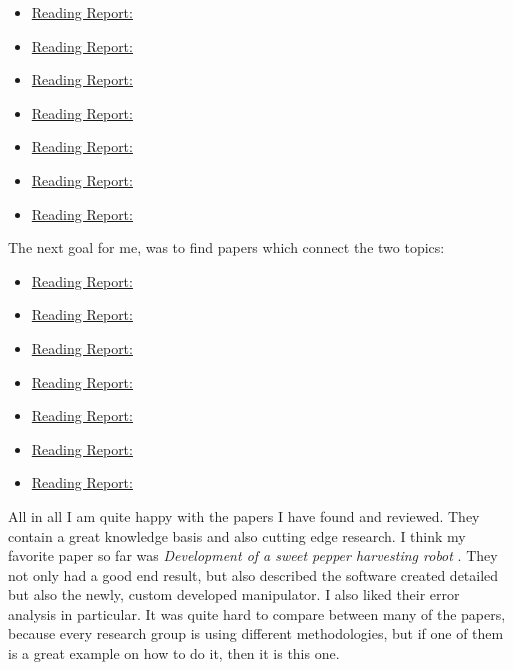     \begin{itemize}
        \item \hyperref[sec:Arai2002]{Reading Report:} \cite{Arai2002}
        \item \hyperref[sec:Brambilla2013]{Reading Report:} \cite{Brambilla2013}
        \item \hyperref[sec:Chamanbaz2017]{Reading Report:} \cite{Chamanbaz2017}
        \item \hyperref[sec:Gerkey2004]{Reading Report:} \cite{Gerkey2004}
        \item \hyperref[sec:Lerman2006]{Reading Report:} \cite{Lerman2006}
        \item \hyperref[sec:Khamis2015]{Reading Report:} \cite{Khamis2015}
        \item \hyperref[sec:Korsah2013]{Reading Report:} \cite{Korsah2013}
    \end{itemize}
    The next goal for me, was to find papers which connect the two topics: 
    \begin{itemize}
        \item \hyperref[sec:Albani2017]{Reading Report:} \cite{Albani2017}
        \item \hyperref[sec:Albani2019]{Reading Report:} \cite{Albani2019}
        \item \hyperref[sec:Bechar2017]{Reading Report:} \cite{Bechar2017}
        \item \hyperref[sec:ConesaMunoz2015]{Reading Report:} \cite{ConesaMunoz2015}
        \item \hyperref[sec:deSantos2016]{Reading Report:} \cite{deSantos2016}
        \item \hyperref[sec:deSantos2020]{Reading Report:} \cite{deSantos2020}
        \item \hyperref[sec:Vasconez2019]{Reading Report:} \cite{Vasconez2019}
    \end{itemize}

    All in all I am quite happy with the papers I have found and reviewed. They contain a great knowledge basis and also cutting edge research. I think my favorite paper so far was \emph{Development of a sweet pepper harvesting robot} \cite{Arad2020}. They not only had a good end result, but also described the software created detailed but also the newly, custom developed manipulator. I also liked their error analysis in particular. It was quite hard to compare between many of the papers, because every research group is using different methodologies, but if one of them is a great example on how to do it, then it is this one.
   






